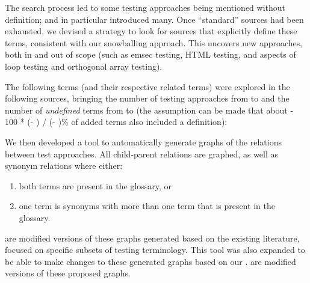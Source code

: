 The search process led to some testing approaches being
mentioned without definition;
\citep{IEEE2022} and \citep{Firesmith2015} in particular introduced many.
Once ``standard'' sources had been exhausted, we devised a strategy to
look for sources that explicitly define these terms, consistent with
our snowballing approach. This uncovers new approaches, both in and out of
scope (such as \acf{emsec} testing, HTML testing, and aspects of loop testing and
orthogonal array testing).

The following terms (and their respective related terms) were explored%
\ifnotpaper in the following sources\fi, bringing the number of testing
approaches from \the\TotalBefore{} to \the\TotalAfter{} and the number of
\emph{undefined} terms from \the\UndefBefore{} to \the\UndefAfter{} (the
assumption can be made that about \the{} - 100 * (\UndefAfter -
\UndefBefore) / (\TotalAfter - \TotalBefore)\relax\% of added terms also
included a definition):



\ifnotpaper\else\ieeeTestTermsTable{}\fi

We then developed a tool to automatically generate graphs of the relations
between test approaches. All child-parent relations are graphed, as well as
synonym relations where either:
\begin{enumerate}
    \item both terms are present in the glossary, or
    \item one term is synonyms with more than one term that is present in the
          glossary.
\end{enumerate}
 are modified versions
of these graphs generated based on the existing literature, focused on specific
subsets of testing terminology. This tool was also expanded to be able to make
changes to these generated graphs based on our .
 are
modified versions of these proposed graphs.
